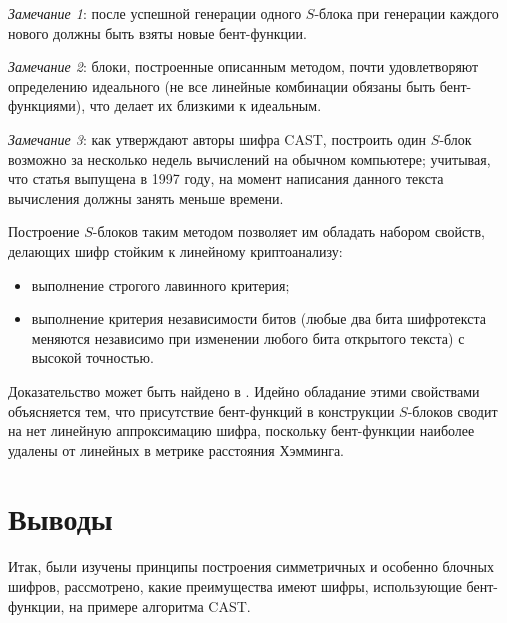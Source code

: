 \documentclass[12pt, a4paper, reqno]{article}
\begin{document}
    \textit{Замечание 1}: после успешной генерации одного $S$-блока при генерации каждого нового
    должны быть взяты новые бент-функции.

    \textit{Замечание 2}: блоки, построенные описанным методом, почти удовлетворяют определению
    идеального (не все линейные комбинации обязаны быть бент-функциями), что делает их близкими к
    идеальным.

    \textit{Замечание 3}: как утверждают авторы шифра CAST, построить один $S$-блок возможно за
    несколько недель вычислений на обычном компьютере; учитывая, что статья выпущена в 1997 году,
    на момент написания данного текста вычисления должны занять меньше времени.

    Построение $S$-блоков таким методом позволяет им обладать набором свойств, делающих шифр стойким
    к линейному криптоанализу:
    \begin{itemize}
        \item выполнение строгого лавинного критерия;
        \item выполнение критерия независимости битов (любые два бита шифротекста меняются
              независимо при изменении любого бита открытого текста) с высокой точностью.
    \end{itemize}

    Доказательство может быть найдено в \cite{cast}. Идейно обладание этими свойствами объясняется
    тем, что присутствие бент-функций в конструкции $S$-блоков сводит на нет линейную аппроксимацию
    шифра, поскольку бент-функции наиболее удалены от линейных в метрике расстояния Хэмминга.

\section{Выводы}

    Итак, были изучены принципы построения симметричных и особенно блочных шифров, рассмотрено,
    какие преимущества имеют шифры, использующие бент-функции, на примере алгоритма CAST.

\printbibliography[heading=bibintoc, title={Список литературы}]
\end{document}
